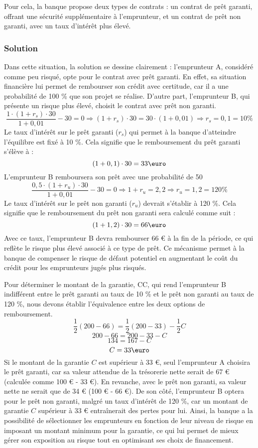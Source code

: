\documentclass[a4paper, 12pt]{report}
\begin{document}
Pour cela, la banque propose deux types de contrats : un contrat de prêt garanti, offrant une sécurité supplémentaire à l'emprunteur, et un contrat de prêt non garanti, avec un taux d'intérêt plus élevé. 

\subsubsection{Solution}

Dans cette situation, la solution se dessine clairement : l'emprunteur A, considéré comme peu risqué, opte pour le contrat avec prêt garanti. En effet, sa situation financière lui permet de rembourser son crédit avec certitude, car il a une probabilité de 100 \% que son projet se réalise. D'autre part, l'emprunteur B, qui présente un risque plus élevé, choisit le contrat avec prêt non garanti.
$$
\frac{1\cdot(1+r_s)\cdot30}{1+0,01}-30=0\Rightarrow (1+r_s)\cdot 30=30\cdot(1+0,01)\Rightarrow r_s=0,1=10\%
$$
Le taux d'intérêt sur le prêt garanti ($r_s$) qui permet à la banque d'atteindre l'équilibre est fixé à 10 \%. Cela signifie que le remboursement du prêt garanti s'élève à :
$$
(1+0,1)\cdot30=33 \text{\euro}
$$
L'emprunteur B remboursera son prêt avec une probabilité de 50 %
$$
\frac{0,5\cdot(1+r_u)\cdot30}{1+0,01}-30=0\Rightarrow 1+r_u = 2,2\Rightarrow r_u=1,2=120\%
$$
Le taux d'intérêt sur le prêt non garanti ($r_u$) devrait s'établir à 120 \%. Cela signifie que le remboursement du prêt non garanti sera calculé comme suit :
$$
\\
(1+1,2)\cdot30=66\text{\euro}
$$
Avec ce taux, l'emprunteur B devra rembourser 66 € à la fin de la période, ce qui reflète le risque plus élevé associé à ce type de prêt. Ce mécanisme permet à la banque de compenser le risque de défaut potentiel en augmentant le coût du crédit pour les emprunteurs jugés plus risqués.

Pour déterminer le montant de la garantie, CC, qui rend l'emprunteur B indifférent entre le prêt garanti au taux de 10 \% et le prêt non garanti au taux de 120 \%, nous devons établir l'équivalence entre les deux options de remboursement.
$$
\frac{1}{2}(200-66)=\frac{1}{2}(200-33)-\frac{1}{2}C
$$
$$
200-66=200-33-C
$$
$$
134=167-C
$$
$$
C=33\text{\euro}
$$
Si le montant de la garantie $C$  est supérieur à 33 €, seul l'emprunteur A choisira le prêt garanti, car sa valeur attendue de la trésorerie nette serait de 67 € (calculée comme 100 € - 33 €). En revanche, avec le prêt non garanti, sa valeur nette ne serait que de 34 € (100 € - 66 €). De son côté, l'emprunteur B optera pour le prêt non garanti, malgré un taux d'intérêt de 120 \%, car un montant de garantie  $C$ supérieur à 33 € entraînerait des pertes pour lui. Ainsi, la banque a la possibilité de sélectionner les emprunteurs en fonction de leur niveau de risque en imposant un montant minimum pour la garantie, ce qui lui permet de mieux gérer son exposition au risque tout en optimisant ses choix de financement.
\end{document}
